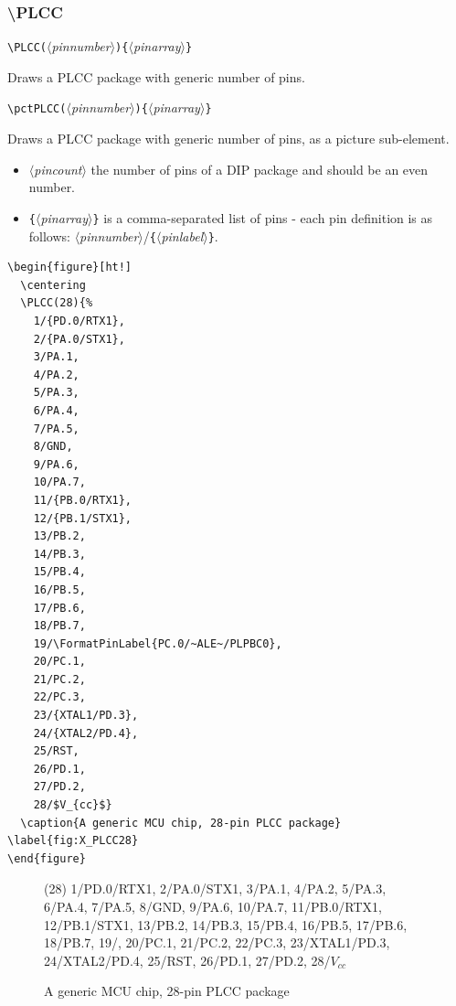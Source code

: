 \documentclass[english,a4paper,10pt]{article}
\newcommand\argu[1]{$\langle$\textit{#1}$\rangle$}
\newcommand\ARGU[1]{\texttt{\{}\argu{#1}\texttt{\}}}
\newcommand\arguD[1]{\texttt{(}\argu{#1}\texttt{)}}
\newcommand\verbinline{\lstinline[basicstyle=\normalsize\ttfamily]}
\begin{document}
\subsubsection{\ttfamily\textbackslash PLCC}
\verbinline|\PLCC|\arguD{pinnumber}\ARGU{pinarray}
\smallskip

Draws a PLCC package with generic number of pins.

\verbinline|\pctPLCC|\arguD{pinnumber}\ARGU{pinarray}
\smallskip

Draws a PLCC package with generic number of pins, as a picture sub-element.

\begin{itemize}
	\item \argu{pincount} the  number of pins of a DIP package and should be an even number.
	\item \ARGU{pinarray} is a comma-separated list of pins  - each pin definition is as follows: \argu{pinnumber}/\ARGU{pinlabel}.
\end{itemize}

\begin{minipage}[t]{0.65\linewidth}
\begin{lstlisting}
\begin{figure}[ht!]
  \centering
  \PLCC(28){%
  	1/{PD.0/RTX1},
  	2/{PA.0/STX1},
  	3/PA.1,										
  	4/PA.2,										
  	5/PA.3,										
  	6/PA.4,										
  	7/PA.5,										
  	8/GND,									
  	9/PA.6,
  	10/PA.7,
  	11/{PB.0/RTX1},
  	12/{PB.1/STX1},
  	13/PB.2,										
  	14/PB.3,										
  	15/PB.4,										
  	16/PB.5,										
  	17/PB.6,										
  	18/PB.7,										
  	19/\FormatPinLabel{PC.0/~ALE~/PLPBC0},
  	20/PC.1,										
  	21/PC.2,										
  	22/PC.3,										
  	23/{XTAL1/PD.3},
  	24/{XTAL2/PD.4},
  	25/RST,
  	26/PD.1,										
  	27/PD.2,										
  	28/$V_{cc}$}								
  \caption{A generic MCU chip, 28-pin PLCC package} \label{fig:X_PLCC28}
\end{figure}
\end{lstlisting}%
\end{minipage}\hfill

\begin{figure}[ht!]
  \centering
  \PLCC(28){%
  	1/{PD.0/RTX1},
  	2/{PA.0/STX1},
  	3/PA.1,										
  	4/PA.2,										
  	5/PA.3,										
  	6/PA.4,										
  	7/PA.5,										
  	8/GND,									
  	9/PA.6,										
  	10/PA.7,										
  	11/{PB.0/RTX1},
  	12/{PB.1/STX1},
  	13/PB.2,
  	14/PB.3,
  	15/PB.4,
  	16/PB.5,
  	17/PB.6,
  	18/PB.7,
  	19/,
  	20/PC.1,
  	21/PC.2,
  	22/PC.3,
  	23/{XTAL1/PD.3},
  	24/{XTAL2/PD.4},
  	25/RST,
  	26/PD.1,
  	27/PD.2,
  	28/$V_{cc}$}
  \caption{A generic MCU chip, 28-pin PLCC package} \label{fig:X_PLCC28}
\end{figure}
\end{document}
